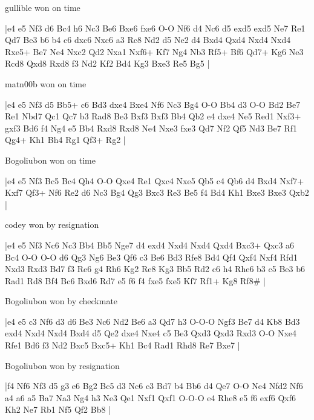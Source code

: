 gullible won on time

\makegametitle
|e4 e5 Nf3 d6 Bc4 h6 Nc3 Be6 Bxe6 fxe6 O-O Nf6 d4 Nc6 d5 exd5 exd5 Ne7 Re1 Qd7 Be3 b6 b4 c6 dxc6 Nxc6 a3 Rc8 Nd2 d5 Ne2 d4 Bxd4 Qxd4 Nxd4 Nxd4 Rxe5+ Be7 Ne4 Nxc2 Qd2 Nxa1 Nxf6+ Kf7 Ng4 Nb3 Rf5+ Bf6 Qd7+ Kg6 Ne3 Rcd8 Qxd8 Rxd8 f3 Nd2 Kf2 Bd4 Kg3 Bxe3 Re5 Bg5  |

\showboard

matn00b won on time

\makegametitle
|e4 e5 Nf3 d5 Bb5+ c6 Bd3 dxe4 Bxe4 Nf6 Nc3 Bg4 O-O Bb4 d3 O-O Bd2 Be7 Re1 Nbd7 Qc1 Qc7 b3 Rad8 Be3 Bxf3 Bxf3 Bb4 Qb2 e4 dxe4 Ne5 Red1 Nxf3+ gxf3 Bd6 f4 Ng4 e5 Bb4 Rxd8 Rxd8 Ne4 Nxe3 fxe3 Qd7 Nf2 Qf5 Nd3 Be7 Rf1 Qg4+ Kh1 Bh4 Rg1 Qf3+ Rg2  |

\showboard

Bogoliubon won on time

\makegametitle
|e4 e5 Nf3 Bc5 Bc4 Qh4 O-O Qxe4 Re1 Qxc4 Nxe5 Qb5 c4 Qb6 d4 Bxd4 Nxf7+ Kxf7 Qf3+ Nf6 Re2 d6 Nc3 Bg4 Qg3 Bxc3 Re3 Be5 f4 Bd4 Kh1 Bxe3 Bxe3 Qxb2  |

\showboard

codey won by resignation

\makegametitle
|e4 e5 Nf3 Nc6 Nc3 Bb4 Bb5 Nge7 d4 exd4 Nxd4 Nxd4 Qxd4 Bxc3+ Qxc3 a6 Bc4 O-O O-O d6 Qg3 Ng6 Be3 Qf6 c3 Be6 Bd3 Rfe8 Bd4 Qf4 Qxf4 Nxf4 Rfd1 Nxd3 Rxd3 Bd7 f3 Re6 g4 Rh6 Kg2 Re8 Kg3 Bb5 Rd2 c6 h4 Rhe6 b3 c5 Be3 b6 Rad1 Rd8 Bf4 Bc6 Bxd6 Rd7 e5 f6 f4 fxe5 fxe5 Kf7 Rf1+ Kg8 Rf8\#  |

\showboard

Bogoliubon won by checkmate

\makegametitle
|e4 e5 c3 Nf6 d3 d6 Be3 Nc6 Nd2 Be6 a3 Qd7 h3 O-O-O Ngf3 Be7 d4 Kb8 Bd3 exd4 Nxd4 Nxd4 Bxd4 d5 Qe2 dxe4 Nxe4 c5 Be3 Qxd3 Qxd3 Rxd3 O-O Nxe4 Rfe1 Bd6 f3 Nd2 Bxc5 Bxc5+ Kh1 Bc4 Rad1 Rhd8 Re7 Bxe7  |

\showboard

Bogoliubon won by resignation

\makegametitle
|f4 Nf6 Nf3 d5 g3 e6 Bg2 Bc5 d3 Nc6 c3 Bd7 b4 Bb6 d4 Qe7 O-O Ne4 Nfd2 Nf6 a4 a6 a5 Ba7 Na3 Ng4 h3 Ne3 Qe1 Nxf1 Qxf1 O-O-O e4 Rhe8 e5 f6 exf6 Qxf6 Kh2 Ne7 Rb1 Nf5 Qf2 Bb8  |

